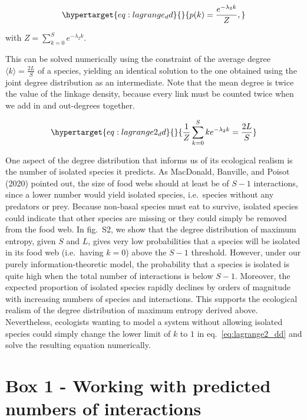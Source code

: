 \documentclass[11pt]{article}
\begin{document}
\begin{equation}\protect\hypertarget{eq:lagrange_dd}{}{p(k) = \frac{e^{-\lambda_2k}}{Z},}\label{eq:lagrange_dd}\end{equation}

with \(Z = \sum_{k=0}^S e^{-\lambda_2k}.\)

This can be solved numerically using the constraint of the average
degree \(\langle k \rangle = \frac{2L}{S}\) of a species, yielding an
identical solution to the one obtained using the joint degree
distribution as an intermediate. Note that the mean degree is twice the
value of the linkage density, because every link must be counted twice
when we add in and out-degrees together.

\begin{equation}\protect\hypertarget{eq:lagrange2_dd}{}{\frac{1}{Z}\sum_{k=0}^S k e^{-\lambda_2k} = \frac{2L}{S}}\label{eq:lagrange2_dd}\end{equation}

One aspect of the degree distribution that informs us of its ecological
realism is the number of isolated species it predicts. As MacDonald,
Banville, and Poisot (2020) pointed out, the size of food webs should at
least be of \(S-1\) interactions, since a lower number would yield
isolated species, i.e.~species without any predators or prey. Because
non-basal species must eat to survive, isolated species could indicate
that other species are missing or they could simply be removed from the
food web. In fig.~S2, we show that the degree distribution of maximum
entropy, given \(S\) and \(L\), gives very low probabilities that a
species will be isolated in its food web (i.e.~having \(k = 0\)) above
the \(S-1\) threshold. However, under our purely information-theoretic
model, the probability that a species is isolated is quite high when the
total number of interactions is below \(S-1\). Moreover, the expected
proportion of isolated species rapidly declines by orders of magnitude
with increasing numbers of species and interactions. This supports the
ecological realism of the degree distribution of maximum entropy derived
above. Nevertheless, ecologists wanting to model a system without
allowing isolated species could simply change the lower limit of \(k\)
to \(1\) in eq.~\ref{eq:lagrange2_dd} and solve the resulting equation
numerically.

\hypertarget{box-1---working-with-predicted-numbers-of-interactions}{%
\section{Box 1 - Working with predicted numbers of
interactions}\label{box-1---working-with-predicted-numbers-of-interactions}}
\end{document}
